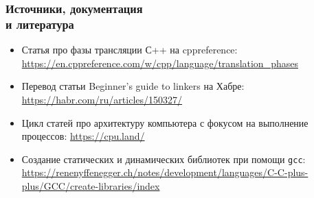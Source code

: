 \documentclass[compress]{beamer}
\begin{document}
\begin{frame}[fragile]

    \frametitle{Источники, документация \\ и литература}

    \begin{itemize}

        \item Статья про фазы трансляции С++ на cppreference:
            \url{https://en.cppreference.com/w/cpp/language/translation\_phases}

        \item Перевод статьи Beginner's guide to linkers на Хабре:
            \url{https://habr.com/ru/articles/150327/}

        \item Цикл статей про архитектуру компьютера с фокусом на выполнение
            процессов: \url{https://cpu.land/}

        \item Создание статических и динамических библиотек при помощи
            \texttt{gcc}: \url{https://renenyffenegger.ch/notes/development/languages/C-C-plus-plus/GCC/create-libraries/index}

    \end{itemize}

\end{frame}
\end{document}
